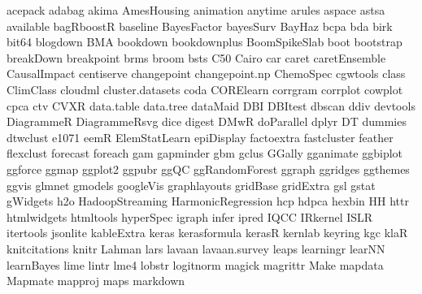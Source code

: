 \documentclass[11pt]{article} %
\begin{document}
\begin{itemize}
        acepack 
        adabag
        akima
        AmesHousing
        animation
        anytime
        arules
        aspace
        astsa
        available
        bagRboostR
        baseline  
        BayesFactor
        bayesSurv
        BayHaz 
        bcpa
        bda 
        birk
        bit64
        blogdown
        BMA
        bookdown
        bookdownplus
        BoomSpikeSlab
        boot
        bootstrap
        breakDown
        breakpoint
        brms  
        broom
        bsts
        C50
        Cairo
        car
        caret 
        caretEnsemble
        CausalImpact
        centiserve
        changepoint
        changepoint.np
        ChemoSpec
        cgwtools
        class
        ClimClass
        cloudml
        cluster.datasets 
        coda
        CORElearn 
        corrgram 
        corrplot
        cowplot
        cpca
        ctv
        CVXR
        data.table
        data.tree 
        dataMaid
        DBI
        DBItest
        dbscan
        ddiv
        devtools 
        DiagrammeR
        DiagrammeRsvg
        dice
        digest 
        DMwR
        doParallel
        dplyr 
        DT
        dummies
        dtwclust
        e1071
        eemR 
        ElemStatLearn
        epiDisplay
        factoextra
        fastcluster 
        feather
        flexclust 
        forecast
        foreach
        gam
        gapminder
        gbm 
        gclus 
        GGally 
        gganimate
        ggbiplot   
        ggforce
        ggmap 
        ggplot2
        ggpubr
        ggQC
        ggRandomForest
        ggraph
        ggridges
        ggthemes
        ggvis 
        glmnet 
        gmodels 
        googleVis  
        graphlayouts
        gridBase 
        gridExtra 
        gsl
        gstat
        gWidgets
        h2o
        HadoopStreaming  
        HarmonicRegression
        hcp 
        hdpca
        hexbin  
        HH 
        httr 
        htmlwidgets
        htmltools
        hyperSpec 
        igraph
        infer 
        ipred 
        IQCC 
        IRkernel
        ISLR 
        itertools 
        jsonlite
        kableExtra
        keras
        kerasformula
        kerasR
        kernlab 
        keyring
        kgc
        klaR 
        knitcitations 
        knitr 
        Lahman
        lars 
        lavaan 
        lavaan.survey 
        leaps
        learningr
        learNN
        learnBayes
        lime 
        lintr 
        lme4 
        lobstr
        logitnorm 
        magick
        magrittr 
        Make 
        mapdata
        Mapmate
        mapproj
        maps
        markdown

\end{itemize}
\end{document}
